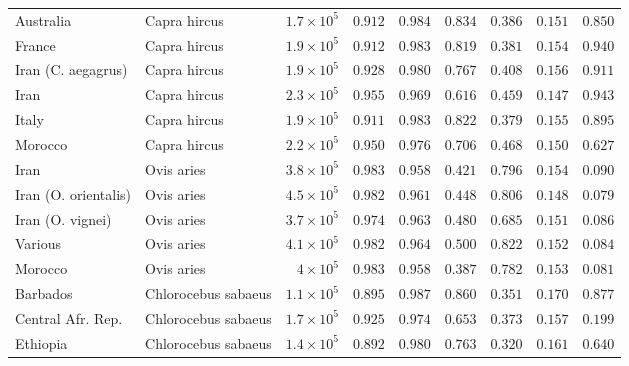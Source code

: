 \documentclass{article}
\begin{document}
\begin{center}
\begin{adjustbox}{width=\textwidth}
\begin{tabular}{||l|l|r||r|r||r|r||r|r||}
                \rowcolor{LIGHTGREY} Australia & Capra hircus & $1.7\times 10^{5}$ & $ 0.912$ & $ 0.984$ & $ 0.834$ & $ 0.386$ & $ 0.151$ & $ 0.850$ \\
                \rowcolor{LIGHTGREY} France & Capra hircus & $1.9\times 10^{5}$ & $ 0.912$ & $ 0.983$ & $ 0.819$ & $ 0.381$ & $ 0.154$ & $ 0.940$ \\
                \rowcolor{LIGHTGREY} Iran (C. aegagrus) & Capra hircus & $1.9\times 10^{5}$ & $ 0.928$ & $ 0.980$ & $ 0.767$ & $ 0.408$ & $ 0.156$ & $ 0.911$ \\
                \rowcolor{LIGHTGREY} Iran & Capra hircus & $2.3\times 10^{5}$ & $ 0.955$ & $ 0.969$ & $ 0.616$ & $ 0.459$ & $ 0.147$ & $ 0.943$ \\
                \rowcolor{LIGHTGREY} Italy & Capra hircus & $1.9\times 10^{5}$ & $ 0.911$ & $ 0.983$ & $ 0.822$ & $ 0.379$ & $ 0.155$ & $ 0.895$ \\
                \rowcolor{LIGHTGREY} Morocco & Capra hircus & $2.2\times 10^{5}$ & $ 0.950$ & $ 0.976$ & $ 0.706$ & $ 0.468$ & $ 0.150$ & $ 0.627$ \\
                Iran & Ovis aries & $3.8\times 10^{5}$ & $ 0.983$ & $ 0.958$ & $ 0.421$ & $ 0.796$ & $ 0.154$ & $ 0.090$ \\
                Iran (O. orientalis) & Ovis aries & $4.5\times 10^{5}$ & $ 0.982$ & $ 0.961$ & $ 0.448$ & $ 0.806$ & $ 0.148$ & $ 0.079$ \\
                Iran (O. vignei) & Ovis aries & $3.7\times 10^{5}$ & $ 0.974$ & $ 0.963$ & $ 0.480$ & $ 0.685$ & $ 0.151$ & $ 0.086$ \\
                Various & Ovis aries & $4.1\times 10^{5}$ & $ 0.982$ & $ 0.964$ & $ 0.500$ & $ 0.822$ & $ 0.152$ & $ 0.084$ \\
                Morocco & Ovis aries & $ 4\times 10^{5}$ & $ 0.983$ & $ 0.958$ & $ 0.387$ & $ 0.782$ & $ 0.153$ & $ 0.081$ \\
                \rowcolor{LIGHTGREY} Barbados & Chlorocebus sabaeus & $1.1\times 10^{5}$ & $ 0.895$ & $ 0.987$ & $ 0.860$ & $ 0.351$ & $ 0.170$ & $ 0.877$ \\
                \rowcolor{LIGHTGREY} Central Afr. Rep. & Chlorocebus sabaeus & $1.7\times 10^{5}$ & $ 0.925$ & $ 0.974$ & $ 0.653$ & $ 0.373$ & $ 0.157$ & $ 0.199$ \\
                \rowcolor{LIGHTGREY} Ethiopia & Chlorocebus sabaeus & $1.4\times 10^{5}$ & $ 0.892$ & $ 0.980$ & $ 0.763$ & $ 0.320$ & $ 0.161$ & $ 0.640$ \\

\end{tabular}
\end{adjustbox}
\end{center}
\end{document}
